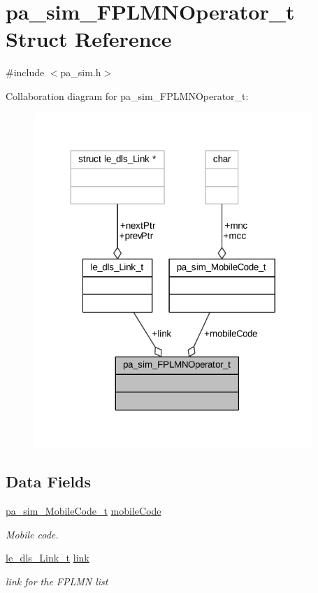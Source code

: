 \hypertarget{structpa__sim___f_p_l_m_n_operator__t}{}\section{pa\+\_\+sim\+\_\+\+F\+P\+L\+M\+N\+Operator\+\_\+t Struct Reference}
\label{structpa__sim___f_p_l_m_n_operator__t}


{\ttfamily \#include $<$pa\+\_\+sim.\+h$>$}



Collaboration diagram for pa\+\_\+sim\+\_\+\+F\+P\+L\+M\+N\+Operator\+\_\+t\+:
\nopagebreak
\begin{figure}[H]
\begin{center}
\leavevmode
\includegraphics[width=299pt]{structpa__sim___f_p_l_m_n_operator__t__coll__graph}
\end{center}
\end{figure}
\subsection*{Data Fields}
\begin{DoxyCompactItemize}
\item 
\hyperlink{structpa__sim___mobile_code__t}{pa\+\_\+sim\+\_\+\+Mobile\+Code\+\_\+t} \hyperlink{structpa__sim___f_p_l_m_n_operator__t_a65ee9bcff051390020c863e07fcb2481}{mobile\+Code}
\begin{DoxyCompactList}\small\item\em Mobile code. \end{DoxyCompactList}\item 
\hyperlink{structle__dls___link__t}{le\+\_\+dls\+\_\+\+Link\+\_\+t} \hyperlink{structpa__sim___f_p_l_m_n_operator__t_a990c4bf9c3d5264f64a72fa419b9f9a2}{link}
\begin{DoxyCompactList}\small\item\em link for the F\+P\+L\+MN list \end{DoxyCompactList}\end{DoxyCompactItemize}


